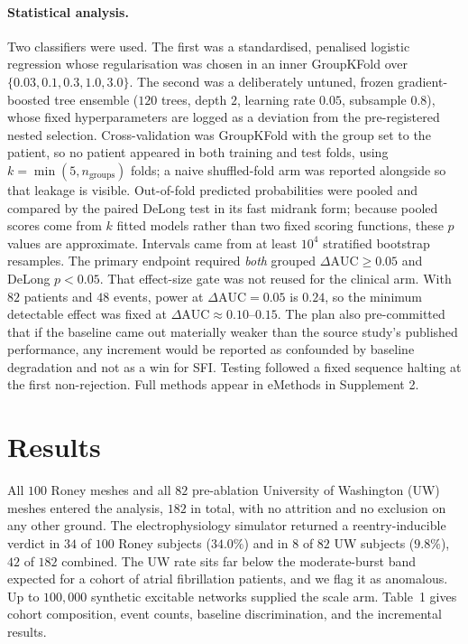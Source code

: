 \documentclass[11pt]{article}
\newcommand{\dAUC}{\ensuremath{\Delta\mathrm{AUC}}}
\begin{document}
\paragraph{Statistical analysis.} Two classifiers were used. The first was a
standardised, penalised logistic regression whose regularisation was chosen in
an inner GroupKFold over $\{0.03,0.1,0.3,1.0,3.0\}$. The second was a
deliberately untuned, frozen gradient-boosted tree ensemble ($120$ trees, depth
$2$, learning rate $0.05$, subsample $0.8$), whose fixed hyperparameters are
logged as a deviation from the pre-registered nested selection. Cross-validation
was GroupKFold with the group set to the patient, so no patient appeared
in both training and test folds, using $k=\min(5,n_{\mathrm{groups}})$ folds; a
naive shuffled-fold arm was reported alongside so that leakage is visible.
Out-of-fold predicted probabilities were pooled and
compared by the paired DeLong test\cite{delong1988} in its fast midrank form\cite{sunxu2014};
because pooled scores come from $k$ fitted models
rather than two fixed scoring functions, these $p$ values are approximate.
Intervals came from at least $10^{4}$ stratified bootstrap resamples. The primary
endpoint required \emph{both} grouped $\dAUC\geq0.05$ and DeLong $p<0.05$. That
effect-size gate was not reused for the clinical arm. With $82$ patients and $48$
events, power at $\dAUC=0.05$ is $0.24$, so the minimum detectable effect was
fixed at $\dAUC\approx0.10$--$0.15$. The plan also pre-committed that if the
baseline came out materially weaker than the source study's published
performance, any increment would be reported as confounded by baseline
degradation and not as a win for SFI. Testing followed a fixed sequence halting
at the first non-rejection. Full methods appear in eMethods in Supplement 2.

\section{Results}

All $100$ Roney meshes and all $82$ pre-ablation University of Washington (UW)
meshes entered the analysis, $182$ in total, with no attrition and no exclusion
on any other ground. The
electrophysiology simulator returned a reentry-inducible verdict in $34$ of
$100$ Roney subjects ($34.0\%$) and in $8$ of $82$ UW subjects ($9.8\%$), $42$
of $182$ combined. The UW rate sits far below the moderate-burst band expected
for a cohort of atrial fibrillation patients, and we flag it as anomalous\cite{kumar2012,oral2008,marquardt2018,kawai2019,liu2020}. Up to
$100{,}000$ synthetic excitable networks supplied the scale arm. Table~1 gives
cohort composition, event counts, baseline discrimination, and the incremental
results.
\end{document}
